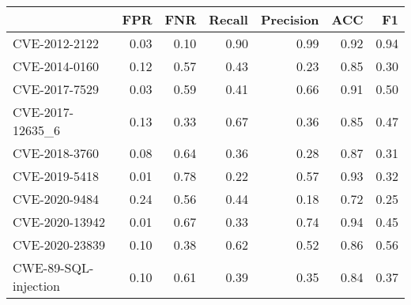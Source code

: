 \begin{tabular}{lrrrrrr}
\toprule
{} &  FPR &  FNR &  Recall &  Precision &  ACC &   F1 \\
\midrule
CVE-2012-2122        & 0.03 & 0.10 &    0.90 &       0.99 & 0.92 & 0.94 \\
CVE-2014-0160        & 0.12 & 0.57 &    0.43 &       0.23 & 0.85 & 0.30 \\
CVE-2017-7529        & 0.03 & 0.59 &    0.41 &       0.66 & 0.91 & 0.50 \\
CVE-2017-12635\_6     & 0.13 & 0.33 &    0.67 &       0.36 & 0.85 & 0.47 \\
CVE-2018-3760        & 0.08 & 0.64 &    0.36 &       0.28 & 0.87 & 0.31 \\
CVE-2019-5418        & 0.01 & 0.78 &    0.22 &       0.57 & 0.93 & 0.32 \\
CVE-2020-9484        & 0.24 & 0.56 &    0.44 &       0.18 & 0.72 & 0.25 \\
CVE-2020-13942       & 0.01 & 0.67 &    0.33 &       0.74 & 0.94 & 0.45 \\
CVE-2020-23839       & 0.10 & 0.38 &    0.62 &       0.52 & 0.86 & 0.56 \\
CWE-89-SQL-injection & 0.10 & 0.61 &    0.39 &       0.35 & 0.84 & 0.37 \\
\bottomrule
\end{tabular}

